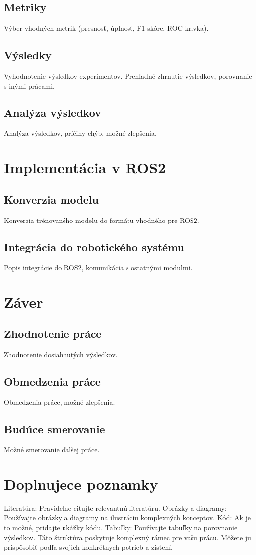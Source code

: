 \subsection{Metriky} Výber vhodných metrik (presnosť, úplnosť, F1-skóre, ROC krivka).
\subsection{Výsledky} Vyhodnotenie výsledkov experimentov. Prehľadné zhrnutie výsledkov, porovnanie s inými prácami.
\subsection{Analýza výsledkov} Analýza výsledkov, príčiny chýb, možné zlepšenia.

\section{Implementácia v ROS2}
\subsection{Konverzia modelu}Konverzia trénovaného modelu do formátu vhodného pre ROS2.
\subsection{Integrácia do robotického systému}Popis integrácie do ROS2, komunikácia s ostatnými modulmi.

\section{Záver}
\subsection{Zhodnotenie práce}Zhodnotenie dosiahnutých výsledkov.
\subsection{Obmedzenia práce}Obmedzenia práce, možné zlepšenia.
\subsection{Budúce smerovanie}Možné smerovanie ďalšej práce.

\section{Doplnujece poznamky }
Literatúra: Pravidelne citujte relevantnú literatúru.
Obrázky a diagramy: Používajte obrázky a diagramy na ilustráciu komplexných konceptov.
Kód: Ak je to možné, pridajte ukážky kódu.
Tabuľky: Používajte tabuľky na porovnanie výsledkov.
Táto štruktúra poskytuje komplexný rámec pre vašu prácu. Môžete ju prispôsobiť podľa svojich konkrétnych potrieb a zistení.